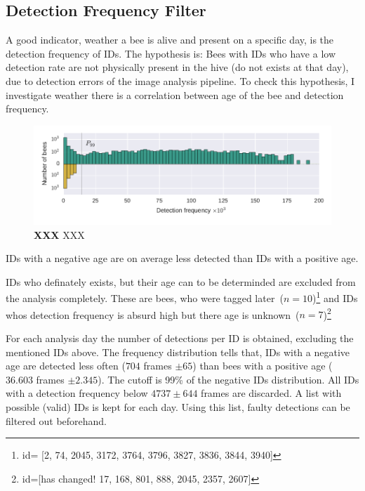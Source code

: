 \subsection{Detection Frequency Filter}
A good indicator, weather a bee is alive and present on a specific day, is the detection frequency of IDs. The hypothesis is: Bees with IDs who have a low detection rate are not physically present in the hive (do not exists at that day), due to detection errors of the image analysis pipeline.
To check this hypothesis, I investigate weather there is a correlation between age of the bee and detection frequency.

\begin{figure}[htb]
	\centering
	\includegraphics[width=1.0\textwidth]{Figures/filter}
	\caption[XXX]{\textbf{XXX} XXX}
	\label{fig:filter}
\end{figure}



IDs with a negative age are on average less detected than IDs with a positive age.

IDs who definately exists, but their age can to be determinded are excluded from the analysis completely. These are bees, who were tagged later~($n=10$)\footnote{id= [2,
	74,
	2045,
	3172,
	3764,
	3796,
	3827,
	3836,
	3844,
	3940]} and IDs whos detection frequency is absurd high but there age is unknown~($n=7$)\footnote{id=[has changed! 
	17,
	168,
	801,
	888,
	2045,
	2357,
	2607]}

For each analysis day the number of detections per ID is obtained, excluding the mentioned IDs above. The frequency distribution tells that, IDs with a negative age are detected less often ($704$ frames $\pm 65$)  than bees with a positive age ($36.603$ frames $\pm 2.345$). The cutoff is 99\% of the negative IDs distribution. All IDs with a detection frequency below $4737 \pm 644$ frames are discarded. A list with possible (valid) IDs is kept for each day. Using this list, faulty detections can be filtered out beforehand.

